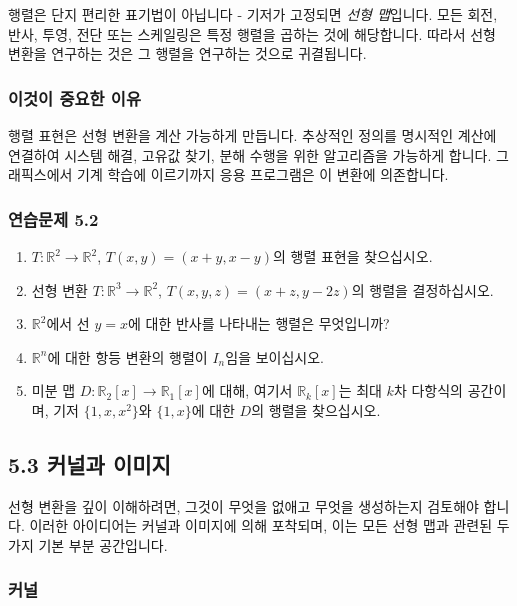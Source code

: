 \documentclass[
  12pt,
  a4paper,
]{article}
\begin{document}
행렬은 단지 편리한 표기법이 아닙니다 - 기저가 고정되면 \emph{선형 맵}입니다. 모든 회전, 반사, 투영, 전단 또는 스케일링은 특정 행렬을 곱하는 것에 해당합니다. 따라서 선형 변환을 연구하는 것은 그 행렬을 연구하는 것으로 귀결됩니다.

\subsubsection{이것이 중요한 이유}\label{why-this-matters-17}

행렬 표현은 선형 변환을 계산 가능하게 만듭니다. 추상적인 정의를 명시적인 계산에 연결하여 시스템 해결, 고유값 찾기, 분해 수행을 위한 알고리즘을 가능하게 합니다. 그래픽스에서 기계 학습에 이르기까지 응용 프로그램은 이 변환에 의존합니다.

\subsubsection{연습문제 5.2}\label{exercises-52}

\begin{enumerate}
\def\labelenumi{\arabic{enumi}.}
\item
  \(T:\mathbb{R}^2 \to \mathbb{R}^2\), \(T(x,y) = (x+y, x-y)\)의 행렬 표현을 찾으십시오.
\item
  선형 변환 \(T:\mathbb{R}^3 \to \mathbb{R}^2\), \(T(x,y,z) = (x+z, y-2z)\)의 행렬을 결정하십시오.
\item
  \(\mathbb{R}^2\)에서 선 \(y=x\)에 대한 반사를 나타내는 행렬은 무엇입니까?
\item
  \(\mathbb{R}^n\)에 대한 항등 변환의 행렬이 \(I_n\)임을 보이십시오.
\item
  미분 맵 \(D:\mathbb{R}_2[x] \to \mathbb{R}_1[x]\)에 대해, 여기서 \(\mathbb{R}_k[x]\)는 최대 \(k\)차 다항식의 공간이며, 기저 \(\{1,x,x^2\}\)와 \(\{1,x\}\)에 대한 \(D\)의 행렬을 찾으십시오.
\end{enumerate}

\subsection{5.3 커널과 이미지}\label{53-kernel-and-image}

선형 변환을 깊이 이해하려면, 그것이 무엇을 없애고 무엇을 생성하는지 검토해야 합니다. 이러한 아이디어는 커널과 이미지에 의해 포착되며, 이는 모든 선형 맵과 관련된 두 가지 기본 부분 공간입니다.

\subsubsection{커널}\label{the-kernel}
\end{document}
